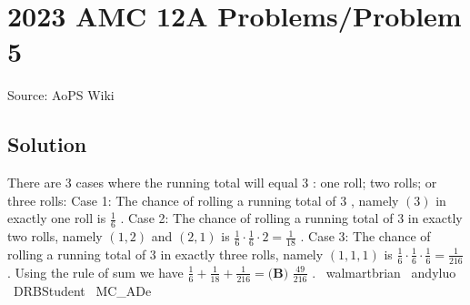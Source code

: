 \documentclass[12pt]{article}
\begin{document}
\section*{{2023 AMC 12A Problems/Problem 5}}
Source: AoPS Wiki

\subsection*{Solution}
There are $3$ cases where the running total will equal $3$ : one roll; two rolls; or three rolls: Case 1: The chance of rolling a running total of $3$ , namely $(3)$ in exactly one roll is $\frac{1}{6}$ . Case 2: The chance of rolling a running total of $3$ in exactly two rolls, namely $(1, 2)$ and $(2, 1)$ is $\frac{1}{6}\cdot\frac{1}{6}\cdot2=\frac{1}{18}$ . Case 3: The chance of rolling a running total of 3 in exactly three rolls, namely $(1, 1, 1)$ is $\frac{1}{6}\cdot\frac{1}{6}\cdot\frac{1}{6}=\frac{1}{216}$ . Using the rule of sum we have $\frac{1}{6}+\frac{1}{18}+\frac{1}{216}=\boxed{\textbf{(B) }\frac{49}{216}}$ . ~walmartbrian ~andyluo ~DRBStudent ~MC_ADe
\end{document}
